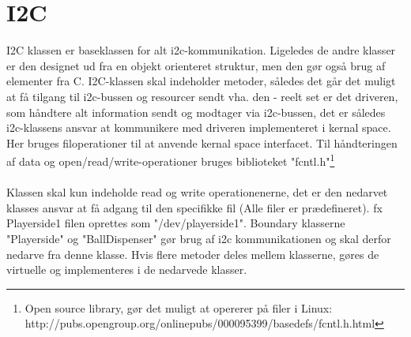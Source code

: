 \documentclass[Softwaredesign/Softwaredesign_main.tex]{subfiles}
\begin{document}
\section{I2C}
I2C klassen er baseklassen for alt i2c-kommunikation. Ligeledes de andre klasser er den designet ud fra en objekt orienteret struktur, men den gør også brug af elementer fra C. I2C-klassen skal indeholder metoder, således det går det muligt at få tilgang til i2c-bussen og resourcer sendt vha. den - reelt set er det driveren, som håndtere alt information sendt og modtager via i2c-bussen, det er således i2c-klassens ansvar at kommunikere med driveren implementeret i kernal space. Her bruges filoperationer til at anvende kernal space interfacet. Til håndteringen af data og open/read/write-operationer bruges biblioteket "fcntl.h"\footnote{Open source library, gør det muligt at opererer på filer i Linux: http://pubs.opengroup.org/onlinepubs/000095399/basedefs/fcntl.h.html} \\\\
Klassen skal kun indeholde read og write operationenerne, det er den nedarvet klasses ansvar at få adgang til den specifikke fil (Alle filer er prædefineret). fx Playerside1 filen oprettes som "/dev/playerside1". Boundary klasserne "Playerside" og "BallDispenser"  gør brug af i2c kommunikationen og skal derfor nedarve fra denne klasse. Hvis flere metoder deles mellem klasserne, gøres de virtuelle og implementeres i de nedarvede klasser. 
\end{document}
